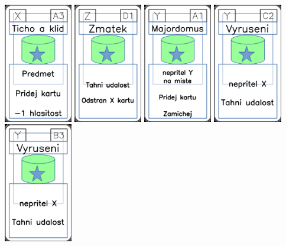 \documentclass[a4paper]{article}
\begin{document}
	\includegraphics[width=3.0cm]{img-5_2}
	\includegraphics[width=3.0cm]{img-5_45}
	\includegraphics[width=3.0cm]{img-5_30}
	\includegraphics[width=3.0cm]{img-5_41}
	\includegraphics[width=3.0cm]{img-5_37}
\end{document}
